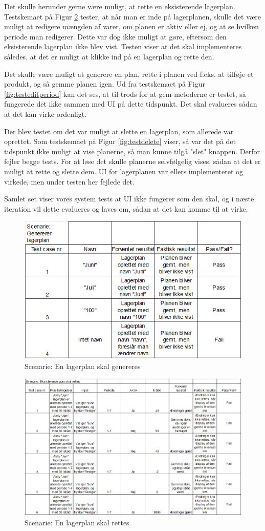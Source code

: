 Det skulle herunder gerne være muligt, at rette en eksisterende lagerplan. Testskemaet på Figur \ref{fig:testedit} tester, at når man er inde på lagerplanen, skulle det være muligt at redigere mængden af varer, om planen er aktiv eller ej, og at se hvilken periode man redigerer. Dette var dog ikke muligt at gøre, eftersom den eksisterende lagerplan ikke blev vist. Testen viser at det skal implementeres således, at det er muligt at klikke ind på en lagerplan og rette den. 

Det skulle være muligt at generere en plan, rette i planen ved f.eks. at tilføje et produkt, og så gemme planen igen. Ud fra testskemaet på Figur \ref{fig:testeditperiod} kan det ses, at til trods for at gem-metoderne er testet, så fungerede det ikke sammen med UI på dette tidspunkt. Det skal evalueres sådan at det kan virke ordenligt.

Der blev testet om det var muligt at slette en lagerplan, som allerede var oprettet. Som testskemaet på Figur \ref{fig:testdelete} viser, så var det på det tidspunkt ikke muligt at vise planerne, så man kunne tilgå "slet" knappen. Derfor fejler begge tests. For at løse det skulle planerne selvfølgelig vises, sådan at det er muligt at rette og slette dem. UI for lagerplanen var ellers implementeret og virkede, men under testen her fejlede det.

Samlet set viser vores system tests at UI ikke fungerer som den skal, og i næste iteration vil dette evalueres og laves om, sådan at det kan komme til at virke.

\begin{figure}[tb]
    \centering
    \includegraphics[width=0.7\hsize]{figures/tests/test_generer_plan.png}
    \caption{Scenarie: En lagerplan skal genereres}
    \label{fig:testgenerate}
\end{figure}

\begin{figure}[tb]
    \centering
    \includegraphics[width=0.7\hsize]{figures/tests/edit_existing_plan.png}
    \caption{Scenarie: En lagerplan skal rettes}
    \label{fig:testedit}
\end{figure}

